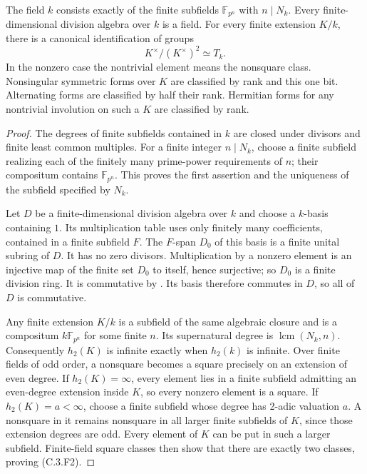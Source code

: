 \begin{lemma}
\label{C:algebraic_field_arithmetic}
The field $k$ consists exactly of the finite subfields
$\mathbb F_{p^n}$ with $n\mid N_k$. Every finite-dimensional
division algebra over $k$ is a field. For every finite extension
$K/k$, there is a canonical identification of groups
\[
                    K^\times/(K^\times)^2\simeq T_k.        \tag{C.3.F2}
\]
In the nonzero case the nontrivial element means the nonsquare class.
Nonsingular symmetric forms over $K$ are classified by rank and
this one bit. Alternating forms are classified by half their rank.
Hermitian forms for any nontrivial involution on such a $K$ are
classified by rank.
\end{lemma}
\begin{proof}
The degrees of finite subfields contained in $k$ are closed under
divisors and finite least common multiples. For a finite integer
$n\mid N_k$, choose a finite subfield realizing each of the finitely
many prime-power requirements of $n$; their compositum contains
$\mathbb F_{p^n}$. This proves the first assertion and the uniqueness
of the subfield specified by $N_k$.

Let $D$ be a finite-dimensional division algebra over $k$ and choose
a $k$-basis containing $1$. Its multiplication table uses only
finitely many coefficients, contained in a finite subfield $F$.
The $F$-span $D_0$ of this basis is a finite unital subring of $D$.
It has no zero divisors. Multiplication by a nonzero element is an
injective map of the finite set $D_0$ to itself, hence surjective;
so $D_0$ is a finite division ring. It is commutative by
\cite[Theorem III.4.4, p.29]{C-ArtinFiniteDivision}.
Its basis therefore commutes in $D$, so all of $D$ is commutative.

Any finite extension $K/k$ is a subfield of the same algebraic
closure and is a compositum $k\mathbb F_{p^n}$ for some finite $n$.
Its supernatural degree is $\operatorname{lcm}(N_k,n)$.
Consequently $h_2(K)$ is infinite exactly when $h_2(k)$ is infinite.
Over finite fields of odd order, a nonsquare becomes a square
precisely on an extension of even degree. If $h_2(K)=\infty$,
every element lies in a finite subfield admitting an even-degree
extension inside $K$, so every nonzero element is a square.
If $h_2(K)=a<\infty$, choose a finite subfield whose degree has
2-adic valuation $a$. A nonsquare in it remains nonsquare in all
larger finite subfields of $K$, since those extension degrees are
odd. Every element of $K$ can be put in such a larger subfield.
Finite-field square classes then show that there are exactly two
classes, proving (C.3.F2).


\end{proof}
